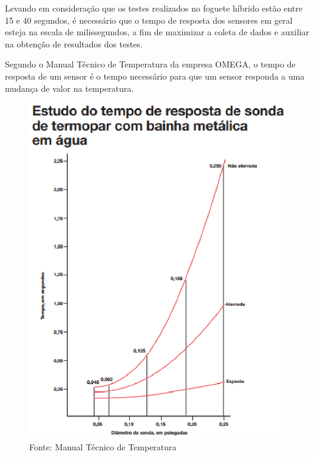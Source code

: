 Levando em consideração que os testes realizados no foguete híbrido estão entre 15 e 40 segundos, é necessário que o tempo de resposta dos sensores em geral esteja na escala de milissegundos, a fim de maximizar a coleta de dados e auxiliar na obtenção de resultados dos testes.

Segundo o Manual Técnico de Temperatura da empresa OMEGA, o tempo de resposta de um sensor é o tempo necessário para que um sensor responda a uma mudança de valor na temperatura.
\begin{figure}[!htb]                  
	\centering                          
	\includegraphics[scale=1.0]{figuras/Figura3.eps}
	\caption{Fonte: Manual Técnico de Temperatura} \label{figmtt}  
\end{figure}

\newpage

